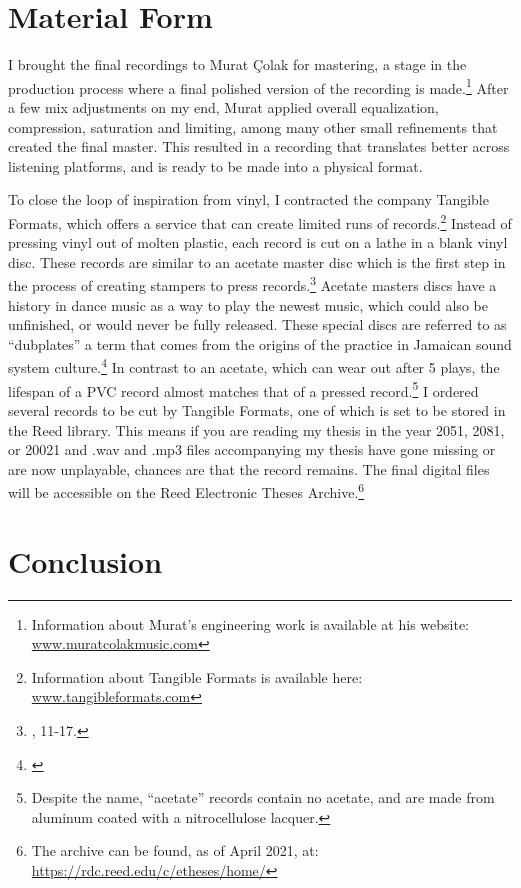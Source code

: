 \documentclass[12pt,twoside]{reedthesis}
\begin{document}
\section{Material Form}

I brought the final recordings to Murat {\c{C}}olak for mastering, a stage in the production process where a final polished version of the recording is made.\footnote{Information about Murat's engineering work is available at his website: \url{www.muratcolakmusic.com}} After a few mix adjustments on my end, Murat applied overall equalization, compression, saturation and limiting, among many other small refinements that created the final master. This resulted in a recording that translates better across listening platforms, and is ready to be made into a physical format.

To close the loop of inspiration from vinyl, I contracted the company Tangible Formats, which offers a service that can create limited runs of records.\footnote{Information about Tangible Formats is available here: \url{www.tangibleformats.com}} Instead of pressing vinyl out of molten plastic, each record is cut on a lathe in a blank vinyl disc. These records are similar to an acetate master disc which is the first step in the process of creating stampers to press records.\footnote{\cite{hooseTurningTablesEngineering2018}, 11-17.} Acetate masters discs have a history in dance music as a way to play the newest music, which could also be unfinished, or would never be fully released. These special discs are referred to as ``dubplates'' a term that comes from the origins of the practice in Jamaican sound system culture.\footnote{\cite{bennettDubplateCultureAnalogue}} In contrast to an acetate, which can wear out after 5 plays, the lifespan of a PVC record almost matches that of a pressed record.\footnote{Despite the name, ``acetate'' records contain no acetate, and are made from aluminum coated with a nitrocellulose lacquer.} I ordered several records to be cut by Tangible Formats, one of which is set to be stored in the Reed library. This means if you are reading my thesis in the year 2051, 2081, or 20021 and .wav and .mp3 files accompanying my thesis have gone missing or are now unplayable, chances are that the record remains. The final digital files will be accessible on the Reed Electronic Theses Archive.\footnote{The archive can be found, as of April 2021, at: \url{https://rdc.reed.edu/c/etheses/home/}}

\section{Conclusion}
\end{document}
